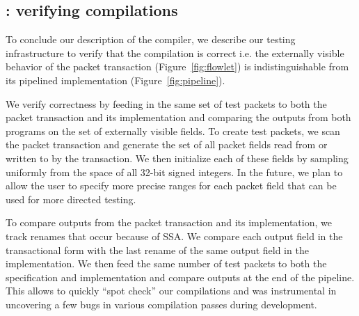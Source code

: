 \subsection{\tester: verifying compilations}

To conclude our description of the compiler, we describe our testing
infrastructure to verify that the compilation is correct i.e. the externally
visible behavior of the packet transaction (Figure~\ref{fig:flowlet}) is
indistinguishable from its pipelined implementation
(Figure~\ref{fig:pipeline}).

We verify correctness by feeding in the same set of test packets to both the
packet transaction and its implementation and comparing the outputs from both
programs on the set of externally visible fields. To create test packets, we
scan the packet transaction and generate the set of all packet fields read from
or written to by the transaction. We then initialize each of these fields by
sampling uniformly from the space of all 32-bit signed integers. In the future,
we plan to allow the user to specify more precise ranges for each packet field
that can be used for more directed testing.

To compare outputs from the packet transaction and its implementation, we track
renames that occur because of SSA. We compare each output field in the
transactional form with the last rename of the same output field in the
implementation. We then feed the same number of test packets to both the
specification and implementation and compare outputs at the end of the
pipeline. This allows to quickly ``spot check'' our compilations and was
instrumental in uncovering a few bugs in various compilation passes during
development.
